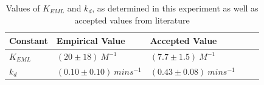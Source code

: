 \begin{table}[h]
    \begin{tabular}{| l | l | l |}
    \hline
    Constant & Empirical Value & Accepted Value \\ \hline
    $K_{EML}$ & $(20\pm{18}){\ }M^{-1}$ & $(7.7\pm{1.5}){\ }M^{-1}$ \ \ \ \ \cite{bib:easy_peasy_values} \\ \hline
    $k_{d}$ & $(0.10\pm{0.10}){\ }mins^{-1}$ & $(0.43\pm{0.08}){\ }mins^{-1}$ \ \ \ \ \cite{bib:easy_peasy_values} \\ 
    \hline
    \end{tabular}
    \caption[Table caption text]{Values of $K_{EML}$ and $k_d$, as determined in this experiment as well as accepted values from literature}
    \label{tbl:summary}
\end{table}
